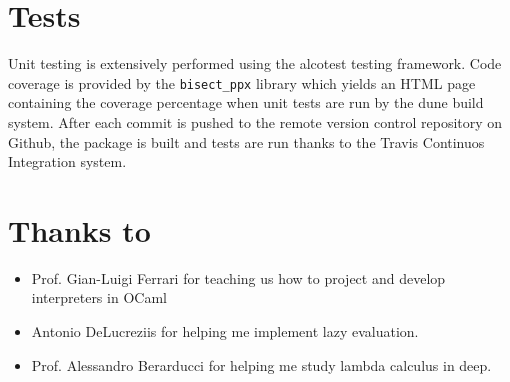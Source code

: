 \documentclass[a4paper, 10pt]{article}
\theoremstyle{plain}%
\theoremstyle{definition}
\theoremstyle{remark}
\begin{document}
\begin{multicols}{2}
\section{Tests}
Unit testing is extensively performed using the alcotest testing framework. Code
coverage is provided by the \texttt{bisect\_ppx} library which yields an HTML
page containing the coverage percentage when unit tests are run by the dune
build system. After each commit is pushed to the remote version control repository on
Github, the package is built and tests are run thanks to the Travis Continuos
Integration system.

\section{Thanks to}

\begin{itemize}
	\item Prof. Gian-Luigi Ferrari for teaching us how to project and develop
	interpreters in OCaml
	\item Antonio DeLucreziis for helping me implement lazy evaluation.
	\item Prof. Alessandro Berarducci for helping me study lambda calculus in deep.
\end{itemize}

\end{multicols}


\end{document}
